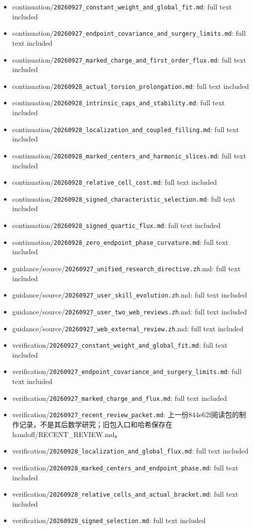 \documentclass[
  10pt,
]{article}
\providecommand{\tightlist}{%
  \setlength{\itemsep}{0pt}\setlength{\parskip}{0pt}}
\begin{document}
\begin{itemize}
\tightlist
\item
  continuation/\nolinkurl{20260927_constant_weight_and_global_fit.md}: full
  text included
\item
  continuation/\nolinkurl{20260927_endpoint_covariance_and_surgery_limits.md}:
  full text included
\item
  continuation/\nolinkurl{20260927_marked_charge_and_first_order_flux.md}:
  full text included
\item
  continuation/\nolinkurl{20260928_actual_torsion_prolongation.md}: full text
  included
\item
  continuation/\nolinkurl{20260928_intrinsic_caps_and_stability.md}: full text
  included
\item
  continuation/\nolinkurl{20260928_localization_and_coupled_filling.md}: full
  text included
\item
  continuation/\nolinkurl{20260928_marked_centers_and_harmonic_slices.md}: full
  text included
\item
  continuation/\nolinkurl{20260928_relative_cell_cost.md}: full text included
\item
  continuation/\nolinkurl{20260928_signed_characteristic_selection.md}: full text
  included
\item
  continuation/\nolinkurl{20260928_signed_quartic_flux.md}: full text included
\item
  continuation/\nolinkurl{20260928_zero_endpoint_phase_curvature.md}: full text
  included
\item
  guidance/source/\nolinkurl{20260927_unified_research_directive.zh}.md: full
  text included
\item
  guidance/source/\nolinkurl{20260927_user_skill_evolution.zh}.md: full text
  included
\item
  guidance/source/\nolinkurl{20260927_user_two_web_reviews.zh}.md: full text
  included
\item
  guidance/source/\nolinkurl{20260927_web_external_review.zh}.md: full text
  included
\item
  verification/\nolinkurl{20260927_constant_weight_and_global_fit.md}: full
  text included
\item
  verification/\nolinkurl{20260927_endpoint_covariance_and_surgery_limits.md}:
  full text included
\item
  verification/\nolinkurl{20260927_marked_charge_and_flux.md}: full text
  included
\item
  verification/\nolinkurl{20260927_recent_review_packet.md}:
  上一份844e62f阅读包的制作记录，不是其后数学研究；旧包入口和哈希保存在handoff/RECENT\_REVIEW.md。
\item
  verification/\nolinkurl{20260928_localization_and_global_flux.md}: full text
  included
\item
  verification/\nolinkurl{20260928_marked_centers_and_endpoint_phase.md}: full
  text included
\item
  verification/\nolinkurl{20260928_relative_cells_and_actual_bracket.md}: full
  text included
\item
  verification/\nolinkurl{20260928_signed_selection.md}: full text included
\end{itemize}
\end{document}
